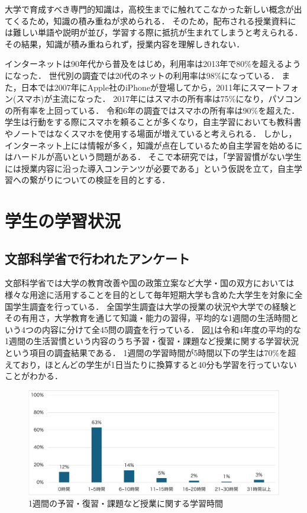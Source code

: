 \documentclass[12pt,a4j,titlepage]{ltjsarticle}
\begin{document}
大学で育成すべき専門的知識は，高校生までに触れてこなかった新しい概念が出てくるため，知識の積み重ねが求められる．
そのため，配布される授業資料には難しい単語や説明が並び，学習する際に抵抗が生まれてしまうと考えられる．
その結果，知識が積み重ねられず，授業内容を理解しきれない．

インターネットは90年代から普及をはじめ，利用率は2013年で80\%を超えるようになった．
世代別の調査では20代のネットの利用率は98\%になっている\cite{somu6}．
また，日本では2007年にApple社のiPhoneが登場してから，2011年にスマートフォン(スマホ)が主流になった\cite{somu1}．
2017年にはスマホの所有率は75\%になり，パソコンの所有率を上回っている．
令和6年の調査ではスマホの所有率は90\%を超えた\cite{somu6}．
学生は行動をする際にスマホを頼ることが多くなり，自主学習においても教科書やノートではなくスマホを使用する場面が増えていると考えられる．
しかし，インターネット上には情報が多く，知識が点在しているため自主学習を始めるにはハードルが高いという問題がある．
そこで本研究では，「学習習慣がない学生には授業内容に沿った導入コンテンツが必要である」という仮説を立て，自主学習への繋がりについての検証を目的とする．

\clearpage

\section{学生の学習状況}

\subsection{文部科学省で行われたアンケート}
文部科学省では大学の教育改善や国の政策立案など大学・国の双方においては様々な用途に活用することを目的として毎年短期大学も含めた大学生を対象に全国学生調査を行っている\cite{monka}．
全国学生調査は大学の授業の状況や大学での経験とその有用さ，大学教育を通じて知識・能力の習得，平均的な1週間の生活時間という4つの内容に分けて全45問の調査を行っている．
図\ref{fig:tyousa}は令和4年度の平均的な1週間の生活習慣という内容のうち予習・復習・課題など授業に関する学習状況という項目の調査結果である．
1週間の学習時間が5時間以下の学生は70\%を超えており，ほとんどの学生が1日当たりに換算すると40分も学習を行っていないことがわかる．

\begin{figure}[!htb]
  \centering
  \includegraphics[width=15cm]{全国学生調査.pdf}
  \caption{1週間の予習・復習・課題など授業に関する学習時間}
  \label{fig:tyousa}
\end{figure}
\end{document}
